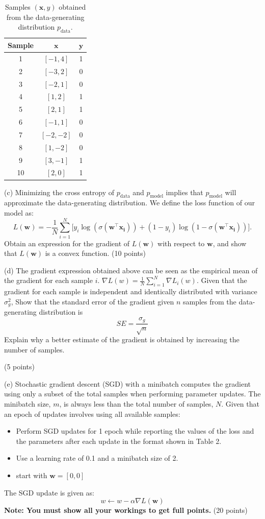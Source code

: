 \documentclass[a3paper,12pt]{article} %
\begin{document}
\begin{table}[h!]
\centering
\begin{tabular}{|c|c|c|}
\hline
\textbf{Sample} & $\mathbf{x}$ & $\mathbf{y}$ \\ \hline
1 & $[-1, 4]$ & 1 \\ \hline
2 & $[-3, 2]$ & 0 \\ \hline
3 & $[-2, 1]$ & 0 \\ \hline
4 & $[1, 2]$ & 1 \\ \hline
5 & $[2, 1]$ & 1 \\ \hline
6 & $[-1, 1]$ & 0 \\ \hline
7 & $[-2, -2]$ & 0 \\ \hline
8 & $[1, -2]$ & 0 \\ \hline
9 & $[3, -1]$ & 1 \\ \hline
10 & $[2, 0]$ & 1 \\ \hline
\end{tabular}
\caption{Samples $(\mathbf{x}, y)$ obtained from the data-generating distribution $p_{\text{data}}$.}
\label{tab:table1}
\end{table}



(c)
Minimizing the cross entropy of $p_{\text{data}}$ and $p_{\text{model}}$ implies that $p_{\text{model}}$ will approximate the data-generating distribution. We define the loss function of our model as:
\[
L(\mathbf{w}) = -\frac{1}{N} \sum^N_{i=1} \big[y_i \log(\sigma(\mathbf{w}^\top \mathbf{x_i})) + (1-y_i) \log(1-\sigma(\mathbf{w}^\top \mathbf{x_i}))\big].
\]
Obtain an expression for the gradient of $L(\mathbf{w})$ with respect to $\mathbf{w}$, and show that $L(\mathbf{w})$ is a convex function.
\hfill (10 points)

(d)
The gradient expression obtained above can be seen as the empirical mean of the gradient for each sample $i$. \(\nabla L(w) = \frac{1}{N}\sum^N_{i=1}\nabla L_i(w)\). Given that the gradient for each sample is independent and identically distributed with variance $\sigma_g^2$, Show that the standard error of the gradient given $n$ samples from the data-generating distribution is \[SE = \frac{\sigma_g}{\sqrt{n}}\] 
Explain why a better estimate of the gradient is obtained by increasing the number of samples.

\hfill (5 points)

(e)
Stochastic gradient descent (SGD) with a minibatch computes the gradient using only a subset of the total samples when performing parameter updates. The minibatch size, $m$, is always less than the total number of samples, $N$. Given that an epoch of updates involves using all available samples:
\begin{itemize}
    \item Perform SGD updates for 1 epoch while reporting the values of the loss and the parameters after each update in the format shown in Table 2.
    \item Use a learning rate of 0.1 and a minibatch size of 2.
    \item start with \(\mathbf{w} = [0,0]\)
\end{itemize}
The SGD update is given as:
\[ w \gets w - \alpha\nabla L(\mathbf{w})\]
\textbf{Note: You must show all your workings to get full points.}
\hfill (20 points)
\end{document}
